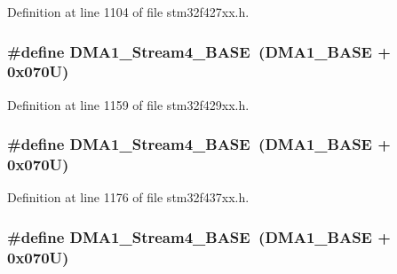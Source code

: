 Definition at line 1104 of file stm32f427xx.\+h.

\subsubsection[{\texorpdfstring{D\+M\+A1\+\_\+\+Stream4\+\_\+\+B\+A\+SE}{DMA1_Stream4_BASE}}]{\setlength{\rightskip}{0pt plus 5cm}\#define D\+M\+A1\+\_\+\+Stream4\+\_\+\+B\+A\+SE~({\bf D\+M\+A1\+\_\+\+B\+A\+SE} + 0x070\+U)}\hypertarget{group___peripheral__memory__map_ga757a3c0d866c0fe68c6176156065a26b}{}\label{group___peripheral__memory__map_ga757a3c0d866c0fe68c6176156065a26b}


Definition at line 1159 of file stm32f429xx.\+h.

\subsubsection[{\texorpdfstring{D\+M\+A1\+\_\+\+Stream4\+\_\+\+B\+A\+SE}{DMA1_Stream4_BASE}}]{\setlength{\rightskip}{0pt plus 5cm}\#define D\+M\+A1\+\_\+\+Stream4\+\_\+\+B\+A\+SE~({\bf D\+M\+A1\+\_\+\+B\+A\+SE} + 0x070\+U)}\hypertarget{group___peripheral__memory__map_ga757a3c0d866c0fe68c6176156065a26b}{}\label{group___peripheral__memory__map_ga757a3c0d866c0fe68c6176156065a26b}


Definition at line 1176 of file stm32f437xx.\+h.

\subsubsection[{\texorpdfstring{D\+M\+A1\+\_\+\+Stream4\+\_\+\+B\+A\+SE}{DMA1_Stream4_BASE}}]{\setlength{\rightskip}{0pt plus 5cm}\#define D\+M\+A1\+\_\+\+Stream4\+\_\+\+B\+A\+SE~({\bf D\+M\+A1\+\_\+\+B\+A\+SE} + 0x070\+U)}\hypertarget{group___peripheral__memory__map_ga757a3c0d866c0fe68c6176156065a26b}{}\label{group___peripheral__memory__map_ga757a3c0d866c0fe68c6176156065a26b}


